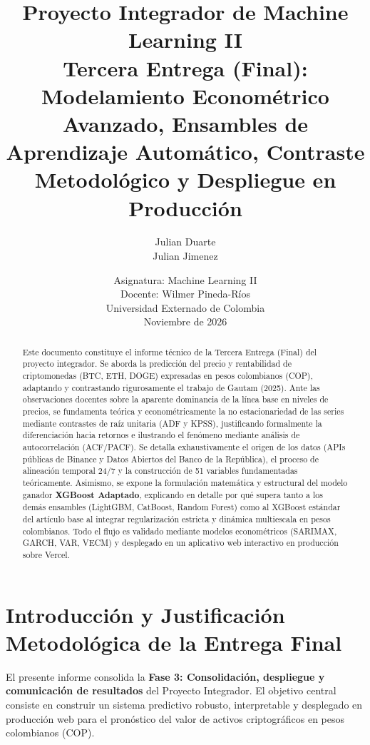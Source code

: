 \documentclass[12pt,letterpaper]{article}
\title{\textbf{Proyecto Integrador de Machine Learning II}\\
\large Tercera Entrega (Final): Modelamiento Econométrico Avanzado, Ensambles de Aprendizaje Automático, Contraste Metodológico y Despliegue en Producción}
\author{
    Julian Duarte \\
    Julian Jimenez
}
\date{Asignatura: Machine Learning II\\
Docente: Wilmer Pineda-Ríos\\
Universidad Externado de Colombia\\
Noviembre de 2026}
\begin{document}
\maketitle

\begin{abstract}
Este documento constituye el informe técnico de la Tercera Entrega (Final) del proyecto integrador. Se aborda la predicción del precio y rentabilidad de criptomonedas (BTC, ETH, DOGE) expresadas en pesos colombianos (COP), adaptando y contrastando rigurosamente el trabajo de Gautam (2025). Ante las observaciones docentes sobre la aparente dominancia de la línea base en niveles de precios, se fundamenta teórica y econométricamente la no estacionariedad de las series mediante contrastes de raíz unitaria (ADF y KPSS), justificando formalmente la diferenciación hacia retornos e ilustrando el fenómeno mediante análisis de autocorrelación (ACF/PACF). Se detalla exhaustivamente el origen de los datos (APIs públicas de Binance y Datos Abiertos del Banco de la República), el proceso de alineación temporal 24/7 y la construcción de 51 variables fundamentadas teóricamente. Asimismo, se expone la formulación matemática y estructural del modelo ganador \textbf{XGBoost Adaptado}, explicando en detalle por qué supera tanto a los demás ensambles (LightGBM, CatBoost, Random Forest) como al XGBoost estándar del artículo base al integrar regularización estricta y dinámica multiescala en pesos colombianos. Todo el flujo es validado mediante modelos econométricos (SARIMAX, GARCH, VAR, VECM) y desplegado en un aplicativo web interactivo en producción sobre Vercel.
\end{abstract}

\tableofcontents
\newpage

\section{Introducción y Justificación Metodológica de la Entrega Final}

El presente informe consolida la \textbf{Fase 3: Consolidación, despliegue y comunicación de resultados} del Proyecto Integrador. El objetivo central consiste en construir un sistema predictivo robusto, interpretable y desplegado en producción web para el pronóstico del valor de activos criptográficos en pesos colombianos (COP).
\end{document}
